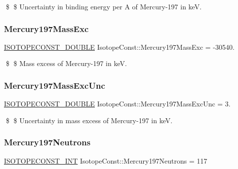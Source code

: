 \$ \$ Uncertainty in binding energy per A of Mercury-\/197 in keV. \mbox{\label{group___isotope_const-_mercury-_hg197_ga08284ece859a105977361634cb8ac9d0}} 
\subsubsection{\texorpdfstring{Mercury197\+Mass\+Exc}{Mercury197MassExc}}
{\footnotesize\ttfamily \mbox{\hyperlink{group___isotope_const-_macros_ga8f45a7272ce02c0b4c65c44636ed719a}{I\+S\+O\+T\+O\+P\+E\+C\+O\+N\+S\+T\+\_\+\+D\+O\+U\+B\+LE}} Isotope\+Const\+::\+Mercury197\+Mass\+Exc = -\/30540.}

\$ \$ Mass excess of Mercury-\/197 in keV. \mbox{\label{group___isotope_const-_mercury-_hg197_gaec5c87279016c292164503e4d79e257e}} 
\subsubsection{\texorpdfstring{Mercury197\+Mass\+Exc\+Unc}{Mercury197MassExcUnc}}
{\footnotesize\ttfamily \mbox{\hyperlink{group___isotope_const-_macros_ga8f45a7272ce02c0b4c65c44636ed719a}{I\+S\+O\+T\+O\+P\+E\+C\+O\+N\+S\+T\+\_\+\+D\+O\+U\+B\+LE}} Isotope\+Const\+::\+Mercury197\+Mass\+Exc\+Unc = 3.}

\$ \$ Uncertainty in mass excess of Mercury-\/197 in keV. \mbox{\label{group___isotope_const-_mercury-_hg197_ga753c6da147aa9cf54c887604c99e5aae}} 
\subsubsection{\texorpdfstring{Mercury197\+Neutrons}{Mercury197Neutrons}}
{\footnotesize\ttfamily \mbox{\hyperlink{group___isotope_const-_macros_ga5f18360b3e99483a35c32d789e62621c}{I\+S\+O\+T\+O\+P\+E\+C\+O\+N\+S\+T\+\_\+\+I\+NT}} Isotope\+Const\+::\+Mercury197\+Neutrons = 117}

